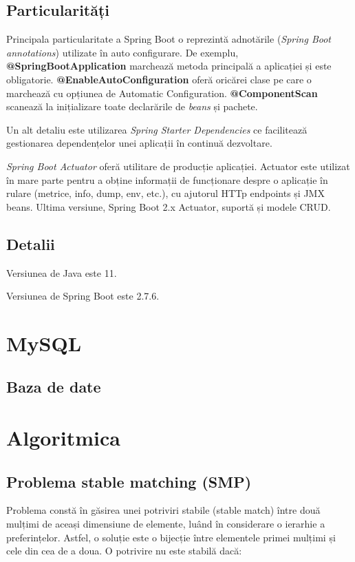 \subsection{Particularități}
Principala particularitate a Spring Boot o reprezintă adnotările (\textit{Spring Boot annotations}) utilizate în auto configurare.
De exemplu, \textbf{@SpringBootApplication} marchează metoda principală a aplicației și este obligatorie.
\textbf{@EnableAutoConfiguration} oferă oricărei clase pe care o marchează cu opțiunea de Automatic Configuration.
\textbf{@ComponentScan} scanează la inițializare toate declarările de \textit{beans} și pachete.

Un alt detaliu este utilizarea \textit{Spring Starter Dependencies} ce facilitează gestionarea dependențelor unei aplicații în continuă dezvoltare.

\textit{Spring Boot Actuator} oferă utilitare de producție aplicației. Actuator este utilizat în mare parte pentru a obține informații de funcționare despre o aplicație în rulare (metrice, info, dump, env, etc.), cu ajutorul HTTp endpoints și JMX beans.
Ultima versiune, Spring Boot 2.x Actuator, suportă și modele CRUD.

\subsection{Detalii}
Versiunea de Java este 11.

Versiunea de Spring Boot este 2.7.6.

\section{MySQL}
\subsection{Baza de date}

\section{Algoritmica}
\subsection{Problema stable matching (SMP)}
Problema constă în găsirea unei potriviri stabile (stable match) între două mulțimi de aceași dimensiune de elemente, luând în considerare o ierarhie a preferințelor. Astfel, o soluție este o bijecție între elementele primei mulțimi și cele din cea de a doua. O potrivire nu este stabilă dacă:


